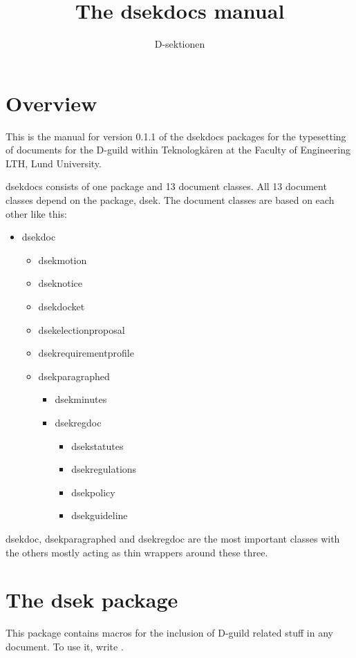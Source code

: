\documentclass[a4paper, oneside]{ltxdoc}
\author{D-sektionen}
\title{The \textsf{dsekdocs} manual}
\begin{document}
\maketitle

\tableofcontents

\section{Overview}
This is the manual for version 0.1.1 of the \textsf{dsekdocs} packages for the
typesetting of documents for the D-guild within Teknologkåren at the Faculty of
Engineering LTH, Lund University.

\textsf{dsekdocs} consists of one package and 13 document classes.  All 13
document classes depend on the package, \textsf{dsek}.  The document classes are
based on each other like this:

\begin{itemize}
\item \textsf{dsekdoc}
  \begin{itemize}
  \item \textsf{dsekmotion}
  \item \textsf{dseknotice}
  \item \textsf{dsekdocket}
  \item \textsf{dsekelectionproposal}
  \item \textsf{dsekrequirementprofile}
  \item \textsf{dsekparagraphed}
    \begin{itemize}
    \item \textsf{dsekminutes}
    \item \textsf{dsekregdoc}
      \begin{itemize}
      \item \textsf{dsekstatutes}
      \item \textsf{dsekregulations}
      \item \textsf{dsekpolicy}
      \item \textsf{dsekguideline}
      \end{itemize}
    \end{itemize}
  \end{itemize}
\end{itemize}

\textsf{dsekdoc}, \textsf{dsekparagraphed} and \textsf{dsekregdoc} are the most
important classes with the others mostly acting as thin wrappers around these
three.

\section{The \textsf{dsek} package}
This package contains macros for the inclusion of D-guild related stuff in any
document.  To use it, write .
\end{document}
